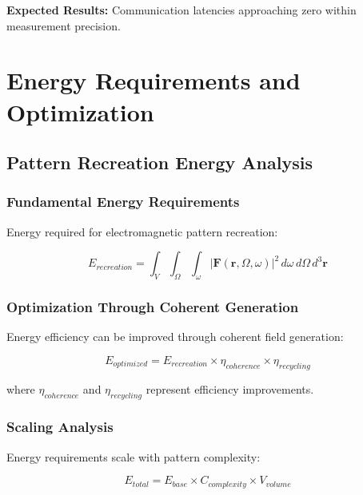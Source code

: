 \documentclass[12pt,a4paper]{article}
\begin{document}
\textbf{Expected Results:} Communication latencies approaching zero within measurement precision.

\section{Energy Requirements and Optimization}

\subsection{Pattern Recreation Energy Analysis}

\subsubsection{Fundamental Energy Requirements}

Energy required for electromagnetic pattern recreation:

\begin{equation}
E_{recreation} = \int_V \int_{\Omega} \int_{\omega} |\mathbf{F}(\mathbf{r}, \Omega, \omega)|^2 \, d\omega \, d\Omega \, d^3\mathbf{r}
\label{eq:recreation_energy}
\end{equation}

\subsubsection{Optimization Through Coherent Generation}

Energy efficiency can be improved through coherent field generation:

\begin{equation}
E_{optimized} = E_{recreation} \times \eta_{coherence} \times \eta_{recycling}
\label{eq:optimized_energy}
\end{equation}

where $\eta_{coherence}$ and $\eta_{recycling}$ represent efficiency improvements.

\subsubsection{Scaling Analysis}

Energy requirements scale with pattern complexity:

\begin{equation}
E_{total} = E_{base} \times C_{complexity} \times V_{volume}
\label{eq:energy_scaling}
\end{equation}
\end{document}
